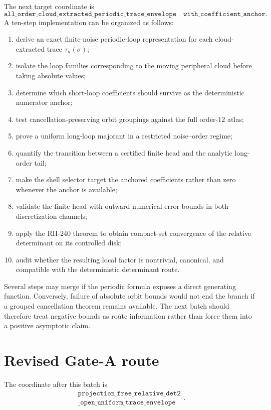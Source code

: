 \documentclass[11pt]{article}
\theoremstyle{remark}
\begin{document}
The next target coordinate is
\[
 \boxed{\texttt{all\_order\_cloud\_extracted\_periodic\_trace\_envelope}
 \quad\texttt{with\_coefficient\_anchor}}.
\]
A ten-step implementation can be organized as follows:
\begin{enumerate}[leftmargin=2em]
\item derive an exact finite-noise periodic-loop representation for each
cloud-extracted trace $\tau_n(\sigma)$;
\item isolate the loop families corresponding to the moving peripheral
cloud before taking absolute values;
\item determine which short-loop coefficients should survive as the
deterministic numerator anchor;
\item test cancellation-preserving orbit groupings against the full
order-$12$ atlas;
\item prove a uniform long-loop majorant in a restricted noise--order regime;
\item quantify the transition between a certified finite head and the
analytic long-order tail;
\item make the shell selector target the anchored coefficients rather than
zero whenever the anchor is available;
\item validate the finite head with outward numerical error bounds in both
discretization channels;
\item apply the RH-240 theorem to obtain compact-set convergence of the
relative determinant on its controlled disk;
\item audit whether the resulting local factor is nontrivial, canonical, and
compatible with the deterministic determinant route.
\end{enumerate}

Several steps may merge if the periodic formula exposes a direct generating
function.  Conversely, failure of absolute orbit bounds would not end the
branch if a grouped cancellation theorem remains available.  The next batch
should therefore treat negative bounds as route information rather than force
them into a positive asymptotic claim.

\section{Revised Gate-A route}

The coordinate after this batch is
\[
 \boxed{\begin{gathered}
 \texttt{projection\_free\_relative\_det2}\\
 \texttt{\_open\_uniform\_trace\_envelope}
 \end{gathered}}.
\]
\end{document}
